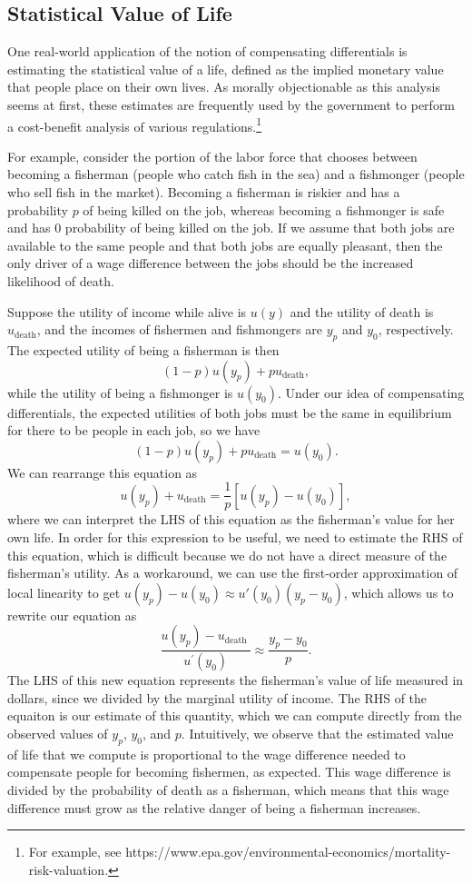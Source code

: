 \subsection*{Statistical Value of Life} 
One real-world application of the notion of compensating differentials is estimating the statistical value of a life, defined as the implied monetary value that people place on their own lives. As morally objectionable as this analysis seems at first, these estimates are frequently used by the government to perform a cost-benefit analysis of various regulations.\footnote{For example, see https://www.epa.gov/environmental-economics/mortality-risk-valuation.}

For example, consider the portion of the labor force that chooses between becoming a fisherman (people who catch fish in the sea) and a fishmonger (people who sell fish in the market). Becoming a fisherman is riskier and has a probability $p$ of being killed on the job, whereas becoming a fishmonger is safe and has $0$ probability of being killed on the job. If we assume that both jobs are available to the same people and that both jobs are equally pleasant, then the only driver of a wage difference between the jobs should be the increased likelihood of death. 

Suppose the utility of income while alive is $u(y)$ and the utility of death is $u_{\text{death}}$, and the incomes of fishermen and fishmongers are $y_p$ and $y_0$, respectively. The expected utility of being a fisherman is then
$$(1-p)u(y_p) + pu_{\text{death}},$$
while the utility of being a fishmonger is $u(y_0)$. Under our idea of compensating differentials, the expected utilities of both jobs must be the same in equilibrium for there to be people in each job, so we have
$$(1-p)u(y_p) + pu_{\text{death}} = u(y_0).$$
We can rearrange this equation as
$$u(y_p) + u_{\text{death}} = \frac{1}{p}\left[u(y_p) - u(y_0)\right],$$
where we can interpret the LHS of this equation as the fisherman's value for her own life. In order for this expression to be useful, we need to estimate the RHS of this equation, which is difficult because we do not have a direct measure of the fisherman's utility. As a workaround, we can use the first-order approximation of local linearity to get $u(y_p) - u(y_0) \approx u'(y_0)(y_p - y_0)$, which allows us to rewrite our equation as 
$$\frac{u\left(y_{p}\right)-u_{\text {death }}}{u^{\prime}\left(y_{0}\right)}\approx \frac{y_{p}-y_{0}}{p}.$$
The LHS of this new equation represents the fisherman's value of life measured in dollars, since we divided by the marginal utility of income. The RHS of the equaiton is our estimate of this quantity, which we can compute directly from the observed values of $y_p$, $y_0$, and $p$. Intuitively, we observe that the estimated value of life that we compute is proportional to the wage difference needed to compensate people for becoming fishermen, as expected. This wage difference is divided by the probability of death as a fisherman, which means that this wage difference must grow as the relative danger of being a fisherman increases.


